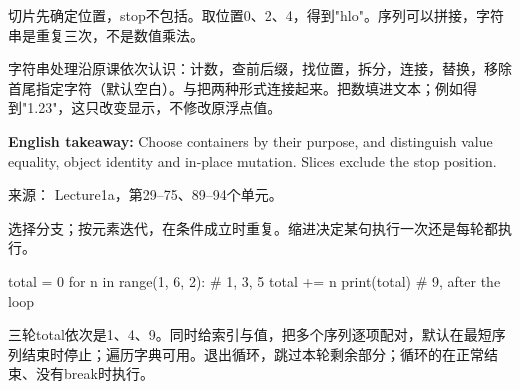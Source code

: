 切片先确定位置，stop不包括。取位置0、2、4，得到"hlo"。序列\StudyInline{+}可以拼接，字符串是重复三次，不是数值乘法。


字符串处理沿原课依次认识：计数，查前后缀，找位置，拆分，连接，替换，移除首尾指定字符（默认空白）。与把两种形式连接起来。把数填进文本；例如得到"1.23"，这只改变显示，不修改原浮点值。


\textbf{English takeaway:} Choose containers by their purpose, and distinguish value equality, object identity and in-place mutation. Slices exclude the stop position.


来源： Lecture1a，第29–75、89–94个单元。








选择分支；按元素迭代，在条件成立时重复。缩进决定某句执行一次还是每轮都执行。



\begin{StudyCode}
total = 0
for n in range(1, 6, 2):   # 1, 3, 5
    total += n
print(total)              # 9, after the loop
\end{StudyCode}


三轮total依次是1、4、9。同时给索引与值，把多个序列逐项配对，默认在最短序列结束时停止；遍历字典可用。退出循环，跳过本轮剩余部分；循环的在正常结束、没有break时执行。


